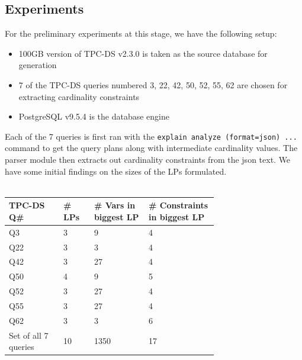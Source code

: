 \documentclass[]{article}
\begin{document}
\begin{multicols}{2}
	\section{Experiments}
		For the preliminary experiments at this stage, we have the following setup:
		\begin{itemize}
			\item 100GB version of TPC-DS v2.3.0 \cite{tpcds} is taken as the source database for generation
			\item 7 of the TPC-DS queries numbered 3, 22, 42, 50, 52, 55, 62 are chosen for extracting cardinality constraints
			\item PostgreSQL v9.5.4 is the database engine
		\end{itemize}
		Each of the 7 queries is first ran with the \texttt{explain analyze (format=json) ... } command to get the query plans along with intermediate cardinality values. 
		The parser module then extracts out cardinality constraints from the json text. 
		We have some initial findings on the sizes of the LPs formulated.
		\\ \\
		{\scriptsize
                \begin{tabular}{ |p{0.2\linewidth}|p{0.1\linewidth}|p{0.2\linewidth}|p{0.2\linewidth}| }
                        \hline
                        TPC-DS Q\# & \# LPs & \# Vars in biggest LP & \# Constraints in biggest LP \\
                        \hline
                        Q3 & 3 & 9 & 4 \\
                        Q22 & 3 & 3 & 4 \\
                        Q42 & 3 & 27 & 4 \\
                        Q50 & 4 & 9 & 5 \\
                        Q52 & 3 & 27 & 4 \\
                        Q55 & 3 & 27 & 4 \\
                        Q62 & 3 & 3 & 6 \\
                        \hline
                        Set of all 7 queries & 10 & 1350 & 17 \\
                        \hline
                \end{tabular}
		}


\end{multicols}
\end{document}
